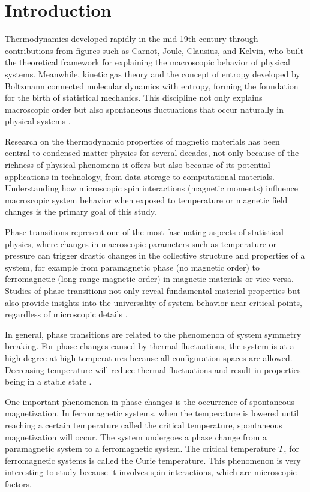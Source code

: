 \section{Introduction}

Thermodynamics developed rapidly in the mid-19th century through contributions from figures such as Carnot, Joule, Clausius, and Kelvin, who built the theoretical framework for explaining the macroscopic behavior of physical systems. Meanwhile, kinetic gas theory and the concept of entropy developed by Boltzmann connected molecular dynamics with entropy, forming the foundation for the birth of statistical mechanics. This discipline not only explains macroscopic order but also spontaneous fluctuations that occur naturally in physical systems \cite{Pathria2001}.

Research on the thermodynamic properties of magnetic materials has been central to condensed matter physics for several decades, not only because of the richness of physical phenomena it offers but also because of its potential applications in technology, from data storage to computational materials. Understanding how microscopic spin interactions (magnetic moments) influence macroscopic system behavior when exposed to temperature or magnetic field changes is the primary goal of this study.

Phase transitions represent one of the most fascinating aspects of statistical physics, where changes in macroscopic parameters such as temperature or pressure can trigger drastic changes in the collective structure and properties of a system, for example from paramagnetic phase (no magnetic order) to ferromagnetic (long-range magnetic order) in magnetic materials or vice versa. Studies of phase transitions not only reveal fundamental material properties but also provide insights into the universality of system behavior near critical points, regardless of microscopic details \cite{Tokura2019}.

In general, phase transitions are related to the phenomenon of system symmetry breaking. For phase changes caused by thermal fluctuations, the system is at a high degree at high temperatures because all configuration spaces are allowed. Decreasing temperature will reduce thermal fluctuations and result in properties being in a stable state \cite{Surungan2017}.

One important phenomenon in phase changes is the occurrence of spontaneous magnetization. In ferromagnetic systems, when the temperature is lowered until reaching a certain temperature called the critical temperature, spontaneous magnetization will occur. The system undergoes a phase change from a paramagnetic system to a ferromagnetic system. The critical temperature $T_c$ for ferromagnetic systems is called the Curie temperature. This phenomenon is very interesting to study because it involves spin interactions, which are microscopic factors.

